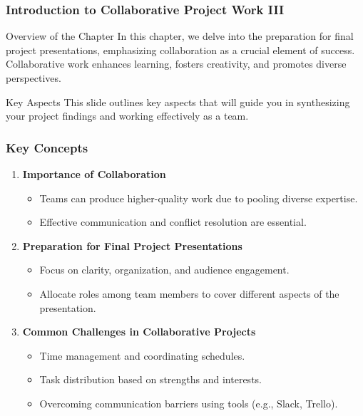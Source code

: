 \documentclass[aspectratio=169]{beamer}
\begin{document}
\frame{\titlepage}

\begin{frame}[fragile]
    \frametitle{Introduction to Collaborative Project Work III}
    \begin{block}{Overview of the Chapter}
        In this chapter, we delve into the preparation for final project presentations, emphasizing collaboration as a crucial element of success. Collaborative work enhances learning, fosters creativity, and promotes diverse perspectives. 
    \end{block}
    \begin{block}{Key Aspects}
        This slide outlines key aspects that will guide you in synthesizing your project findings and working effectively as a team.
    \end{block}
\end{frame}

\begin{frame}[fragile]
    \frametitle{Key Concepts}
    \begin{enumerate}
        \item \textbf{Importance of Collaboration}
            \begin{itemize}
                \item Teams can produce higher-quality work due to pooling diverse expertise.
                \item Effective communication and conflict resolution are essential.
            \end{itemize}
        \item \textbf{Preparation for Final Project Presentations}
            \begin{itemize}
                \item Focus on clarity, organization, and audience engagement.
                \item Allocate roles among team members to cover different aspects of the presentation.
            \end{itemize}
        \item \textbf{Common Challenges in Collaborative Projects}
            \begin{itemize}
                \item Time management and coordinating schedules.
                \item Task distribution based on strengths and interests.
                \item Overcoming communication barriers using tools (e.g., Slack, Trello).
            \end{itemize}
    \end{enumerate}
\end{frame}
\end{document}
